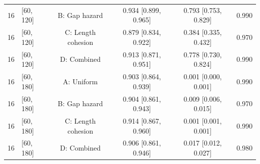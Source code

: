\begin{table}[!htbp]
\begin{tabular}{@{}llcccc@{}}
16 & [60, 120] & B: Gap hazard & 0.934 [0.899, 0.965] & 0.793 [0.753, 0.829] & 0.990 \\
16 & [60, 120] & C: Length cohesion & 0.879 [0.834, 0.922] & 0.384 [0.335, 0.432] & 0.970 \\
16 & [60, 120] & D: Combined & 0.913 [0.871, 0.951] & 0.778 [0.730, 0.824] & 0.990 \\
16 & [60, 180] & A: Uniform & 0.903 [0.864, 0.939] & 0.001 [0.000, 0.001] & 0.990 \\
16 & [60, 180] & B: Gap hazard & 0.904 [0.861, 0.943] & 0.009 [0.006, 0.015] & 0.970 \\
16 & [60, 180] & C: Length cohesion & 0.914 [0.867, 0.960] & 0.001 [0.001, 0.001] & 0.990 \\
16 & [60, 180] & D: Combined & 0.906 [0.861, 0.946] & 0.017 [0.012, 0.027] & 0.980 \\
\bottomrule
\end{tabular}
\end{table}
